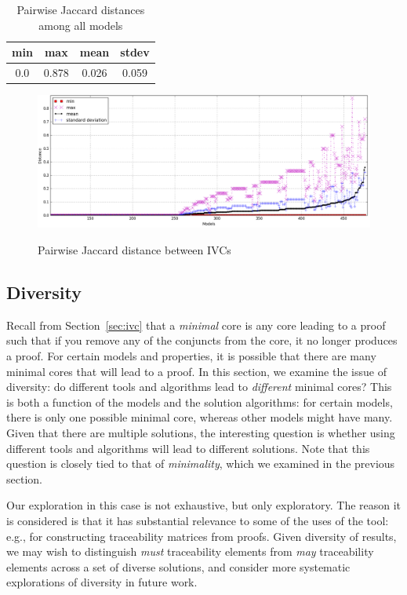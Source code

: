 \begin{table}
  \centering
  \begin{tabular}{ |c|c|c|c| }
    \hline
     min & max & mean & stdev \\[0.5ex]
    \hline
     0.0   & 0.878 & 0.026 & 0.059 \\[0.5ex]
    \hline
  \end{tabular}
  \caption{Pairwise Jaccard distances among all models}
  \label{tab:jaccard-avg}
\end{table}

\begin{figure}
  \centering
  \includegraphics[width=\textwidth]{figs/jacdis2.png} \\
  \caption{Pairwise Jaccard distance between IVCs}\label{fig:jacdis}
\end{figure}

\subsection{Diversity}
\label{sec:diversity}
Recall from Section~\ref{sec:ivc} that a {\em minimal} core is any core leading to a proof such that if you remove any of the conjuncts from the core, it no longer produces a proof.  For certain models and properties, it is possible that there are many minimal cores that will lead to a proof.  In this section, we examine the issue of diversity: do different tools and algorithms lead to {\em different} minimal cores?  This is both a function of the models and the solution algorithms: for certain models, there is only one possible minimal core, whereas other models might have many. Given that there are multiple solutions, the interesting question is whether using different tools and algorithms will lead to different solutions.  Note that this question is closely tied to that of {\em minimality}, which we examined in the previous section.

Our exploration in this case is not exhaustive, but only exploratory.  The reason it is considered is that it has substantial relevance to some of the uses of the tool: e.g., for constructing traceability matrices from proofs.  Given diversity of results, we may wish to distinguish {\em must} traceability elements from {\em may} traceability elements across a set of diverse solutions, and consider more systematic explorations of diversity in future work.


